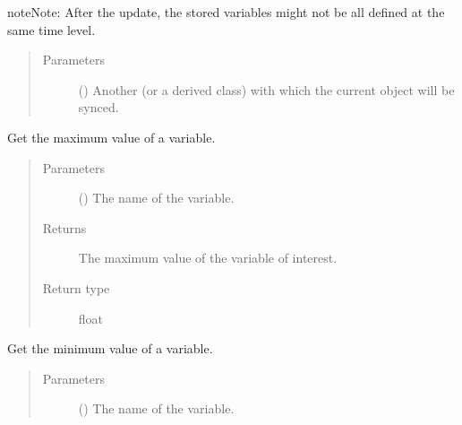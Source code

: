 \documentclass[letterpaper,10pt,english]{sphinxmanual}
\begin{document}
\begin{fulllineitems}
\begin{fulllineitems}
\begin{itemize}
\end{itemize}

\begin{sphinxadmonition}{note}{Note:}
After the update, the stored variables might not be all defined at the same time level.
\end{sphinxadmonition}
\begin{quote}\begin{description}
\item[{Parameters}] \leavevmode
{} () \textendash{} Another {\hyperref[\detokenize{api:storages.grid_data.GridData}]{}} (or a derived class) with which the current object will be synced.

\end{description}\end{quote}

\end{fulllineitems}


\begin{fulllineitems}
\label{\detokenize{api:storages.grid_data.GridData.get_max}}
Get the maximum value of a variable.
\begin{quote}\begin{description}
\item[{Parameters}] \leavevmode
{} () \textendash{} The name of the variable.

\item[{Returns}] \leavevmode
The maximum value of the variable of interest.

\item[{Return type}] \leavevmode
float

\end{description}\end{quote}

\end{fulllineitems}


\begin{fulllineitems}
\label{\detokenize{api:storages.grid_data.GridData.get_min}}
Get the minimum value of a variable.
\begin{quote}\begin{description}
\item[{Parameters}] \leavevmode
{} () \textendash{} The name of the variable.


\end{description}
\end{quote}
\end{fulllineitems}
\end{fulllineitems}
\end{document}
